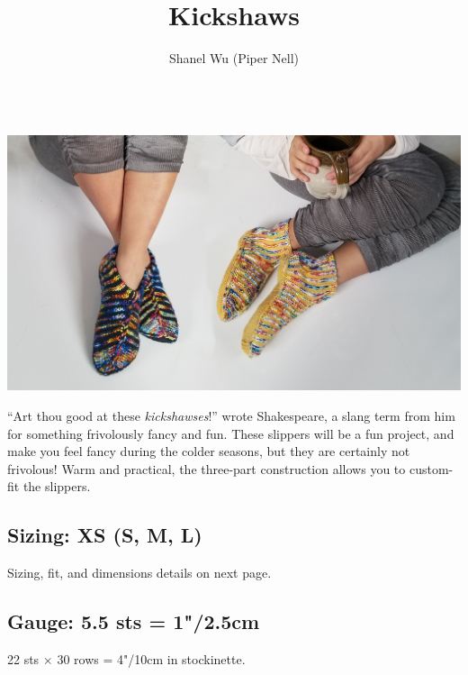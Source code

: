 \documentclass[12pt]{article}
\title{Kickshaws} %
\author{Shanel Wu (Piper Nell)}
\begin{document}
\begin{titlingpage}


{\selectfont
\HUGE\textbf{\thetitle}
\hspace{2em} \hfill %
\normalsize\theauthor
}

~\\
\includegraphics[width=\linewidth]{./photos/smallVersions/bothMe_LANDSCAPE_200dpi.jpg}

\begin{multicols}{2}
\small

``Art thou good at these \emph{kickshawses}!” wrote Shakespeare, a slang term from him for something frivolously fancy and fun. These slippers will be a fun project, and make you feel fancy during the colder seasons, but they are certainly not frivolous! Warm and practical, the three-part construction allows you to custom-fit the slippers. \vspace{-1em}

\subsection*{Sizing: XS (S, M, L)}
Sizing, fit, and dimensions details on next page.

\subsection*{Gauge: 5.5 sts = 1"/2.5cm}

22 sts $\times$ 30 rows = 4"/10cm in stockinette.


\end{multicols}
\end{titlingpage}
\end{document}
